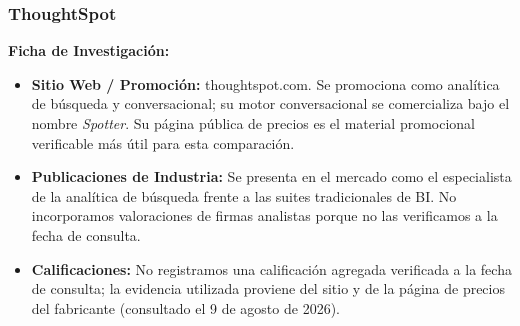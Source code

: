 \clearpage
\subsubsection{ThoughtSpot}

\textbf{Ficha de Investigación:}
\begin{itemize}
    \item \textbf{Sitio Web / Promoción:} thoughtspot.com. Se promociona como analítica de búsqueda y conversacional; su motor conversacional se comercializa bajo el nombre \textit{Spotter}. Su página pública de precios es el material promocional verificable más útil para esta comparación.
    \item \textbf{Publicaciones de Industria:} Se presenta en el mercado como el especialista de la analítica de búsqueda frente a las suites tradicionales de BI. No incorporamos valoraciones de firmas analistas porque no las verificamos a la fecha de consulta.
    \item \textbf{Calificaciones:} No registramos una calificación agregada verificada a la fecha de consulta; la evidencia utilizada proviene del sitio y de la página de precios del fabricante (consultado el 9 de agosto de 2026).
\end{itemize}
\vspace{0.3cm}

